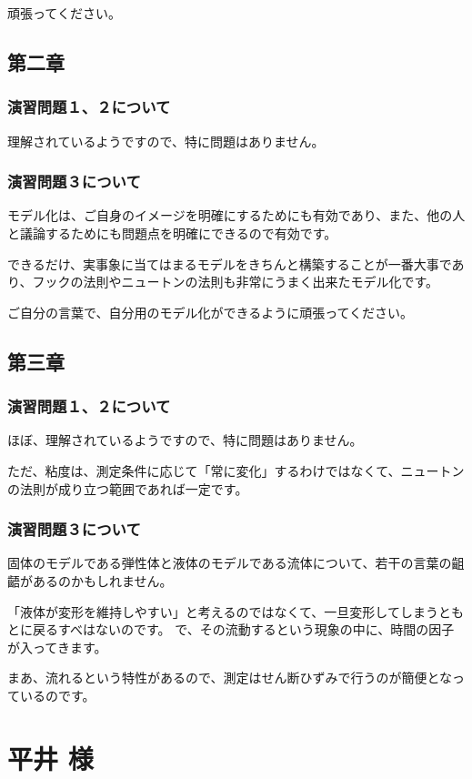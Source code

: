\documentclass[uplatex,dvipdfmx,a4paper,11pt]{jsreport}
\begin{document}
頑張ってください。

\subsection*{第二章}
\subsubsection*{演習問題１、２について}
理解されているようですので、特に問題はありません。

\subsubsection*{演習問題３について}

モデル化は、ご自身のイメージを明確にするためにも有効であり、また、他の人と議論するためにも問題点を明確にできるので有効です。

できるだけ、実事象に当てはまるモデルをきちんと構築することが一番大事であり、フックの法則やニュートンの法則も非常にうまく出来たモデル化です。

ご自分の言葉で、自分用のモデル化ができるように頑張ってください。

\subsection*{第三章}
\subsubsection*{演習問題１、２について}
ほぼ、理解されているようですので、特に問題はありません。

ただ、粘度は、測定条件に応じて「常に変化」するわけではなくて、ニュートンの法則が成り立つ範囲であれば一定です。

\subsubsection*{演習問題３について}

固体のモデルである弾性体と液体のモデルである流体について、若干の言葉の齟齬があるのかもしれません。

「液体が変形を維持しやすい」と考えるのではなくて、一旦変形してしまうともとに戻るすべはないのです。
で、その流動するという現象の中に、時間の因子が入ってきます。

まあ、流れるという特性があるので、測定はせん断ひずみで行うのが簡便となっているのです。

\clearpage
\section*{平井 様}
\end{document}
